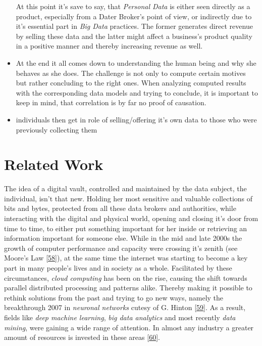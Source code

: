 \documentclass[12pt,english,a4paper,titlepage,cleardoublepage=empty,dottedtoc]{report}
\begin{document}
\begin{itemize}
  At this point it's save to say, that \emph{Personal Data} is either
  seen directly as a product, especially from a Dater Broker's point of
  view, or indirectly due to it's essential part in \emph{Big Data}
  practices. The former generates direct revenue by selling these data
  and the latter might affect a business's product quality in a positive
  manner and thereby increasing revenue as well.
\item
  At the end it all comes down to understanding the human being and why
  she behaves as she does. The challenge is not only to compute certain
  motives but rather concluding to the right ones. When analyzing
  computed results with the corresponding data models and trying to
  conclude, it is important to keep in mind, that correlation is by far
  no proof of causation.
\item
  individuals then get in role of selling/offering it's own data to
  those who were previously collecting them
\end{itemize}

\section{Related Work}\label{related-work}

The idea of a digital vault, controlled and maintained by the data
subject, the individual, isn't that new. Holding her most sensitive and
valuable collections of bits and bytes, protected from all these data
brokers and authorities, while interacting with the digital and physical
world, opening and closing it's door from time to time, to either put
something important for her inside or retrieving an information
important for someone else. While in the mid and late 2000s the growth
of computer performance and capacity were crossing it's zenith (see
Moore's Law {[}\protect\hyperlink{ref-paper_1965_moors-law}{58}{]}), at
the same time the internet was starting to become a key part in many
people's lives and in society as a whole. Facilitated by these
circumstances, \emph{cloud computing} has been on the rise, causing the
shift towards parallel distributed processing and patterns alike.
Thereby making it possible to rethink solutions from the past and trying
to go new ways, namely the breakthrough 2007 in \emph{neuronal networks}
cutesy of G. Hinton
{[}\protect\hyperlink{ref-podcast_2015_cre-neuronale-netze}{59}{]}. As a
result, fields like \emph{deep machine learning}, \emph{big data
analytics} and most recently \emph{data mining}, were gaining a wide
range of attention. In almost any industry a greater amount of resources
is invested in these areas
{[}\protect\hyperlink{ref-web_2016_industries-intention-to-invest-in-big-data}{60}{]}.
\end{document}
